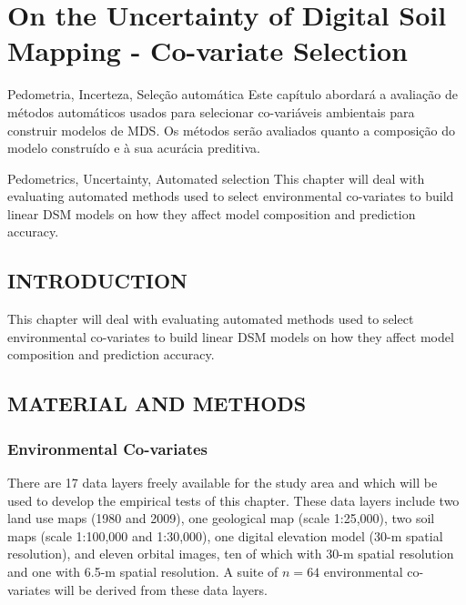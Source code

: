 \artigotrue
\chapter{On the Uncertainty of Digital Soil Mapping - Co-variate Selection}
\label{chap:chapter03}

\begin{chapterabstractPOR}{Pedometria, Incerteza, Seleção automática}
Este capítulo abordará a avaliação de métodos automáticos usados para selecionar co-variáveis ambientais para construir modelos de MDS. Os métodos serão avaliados quanto a composição do modelo construído e à sua acurácia preditiva.
\end{chapterabstractPOR}

\begin{chapterabstractENG}{Pedometrics, Uncertainty, Automated selection}
This chapter will deal with evaluating automated methods used to select environmental co-variates to build linear DSM models on how they affect model composition and prediction accuracy.
\end{chapterabstractENG}

\section{INTRODUCTION}

This chapter will deal with evaluating automated methods used to select environmental co-variates to build linear DSM models on how they affect model composition and prediction accuracy.

\section{MATERIAL AND METHODS}

\subsection{Environmental Co-variates}

There are 17 data layers freely available for the study area and which will be used to develop the empirical tests of this chapter. These data layers include two land use maps (1980 and 2009), one geological map (scale 1:25,000), two soil maps (scale 1:100,000 and 1:30,000), one digital elevation model (30-m spatial resolution), and eleven orbital images, ten of which with 30-m spatial resolution and one with 6.5-m spatial resolution. A suite of $n=64$ environmental co-variates will be derived from these data layers.

